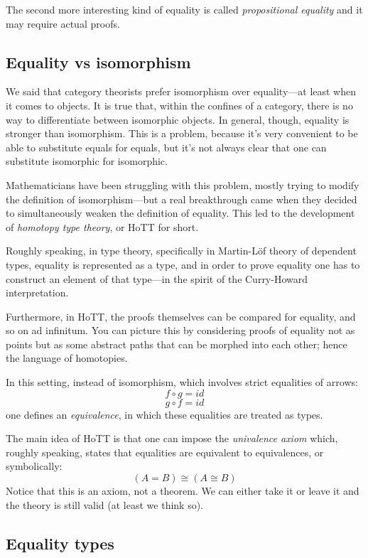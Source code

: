 \documentclass[DaoFP]{subfiles}
\begin{document}
The second more interesting kind of equality is called \emph{propositional equality} and it may require actual proofs. 

\subsection{Equality vs isomorphism}

We said that category theorists prefer isomorphism over equality---at least when it comes to objects. It is true that, within the confines of a category, there is no way to differentiate between isomorphic objects. In general, though, equality is stronger than isomorphism. This is a problem, because it's very convenient to be able to substitute equals for equals, but it's not always clear that one can substitute isomorphic for isomorphic. 

Mathematicians have been struggling with this problem, mostly trying to modify the definition of isomorphism---but a real breakthrough came when they decided to simultaneously weaken the definition of equality. This led to the development of \emph{homotopy type theory}, or HoTT for short. 

Roughly speaking, in type theory, specifically in Martin-L{\"o}f theory of dependent types, equality is represented as a type, and in order to prove equality one has to construct an element of that type---in the spirit of the Curry-Howard interpretation. 

Furthermore, in HoTT, the proofs themselves can be compared for equality, and so on ad infinitum. You can picture this by considering proofs of equality not as points but as some abstract paths that can be morphed into each other; hence the language of homotopies.

In this setting, instead of isomorphism, which involves strict equalities of arrows:
\[ f \circ g = id \]
\[ g \circ f = id \]
one defines an \emph{equivalence}, in which these equalities are treated as types.

The main idea of HoTT is that one can impose the \emph{univalence axiom} which, roughly speaking, states that equalities are equivalent to equivalences, or symbolically:
\[ (A = B) \cong (A \cong B) \]
Notice that this is an axiom, not a theorem. We can either take it or leave it and the theory is still valid (at least we think so).
\subsection{Equality types}
\end{document}
